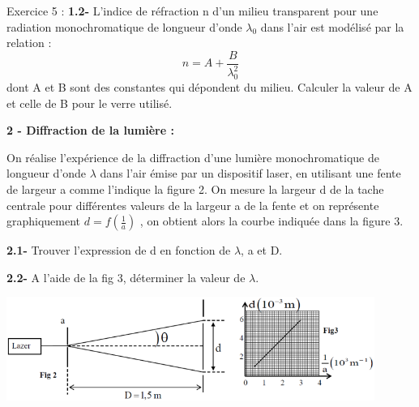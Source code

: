 \documentclass[12pt, french]{article}
\begin{document}
\begin{Box2}{Exercice 5 :}
\textbf{1.2- } L’indice de réfraction n d’un milieu transparent pour une radiation
monochromatique de longueur d’onde $\lambda_0$ dans l’air est modélisé par la
relation : $$n = A + \frac{B}{\lambda^2_0} $$
dont A et B sont des constantes qui dépondent du milieu. Calculer la valeur de A et celle de B pour le verre utilisé.

\textbf{2 - Diffraction de la lumière :}

On réalise l’expérience de la diffraction d’une lumière monochromatique de longueur d’onde $\lambda$
dans l’air émise par un dispositif laser, en utilisant une fente de largeur a comme l’indique la figure
2. On mesure la largeur d de la tache centrale pour différentes valeurs de la largeur a de la fente et on
représente graphiquement $d = f(\frac{1}{a})$ , on obtient alors la courbe indiquée dans la figure 3.

\textbf{2.1- }Trouver l’expression de d en fonction de $\lambda$, a et D.

\textbf{2.2- }A l’aide de la fig 3, déterminer la valeur de $\lambda$.

\begin{center}
	  \vspace{-1.5cm}
	\includegraphics[width=0.9\textwidth]{./img/ex5_2.png}
  \end{center}
\end{Box2}







\end{document}
